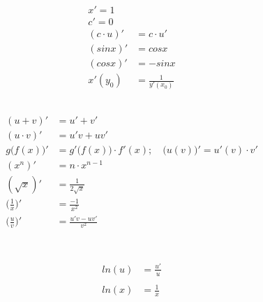 \documentclass[10pt,a4paper]{scrartcl}
\begin{document}
\newpage
	\begin{minipage}{0.3\linewidth}			
		\begin{align*}
		x' = 1 \\
		c' = 0 \\
		(c \cdot u)' &= c \cdot u'\\
		(sin x)' &= cos x\\
		(cos x)' &= -sin x \\
		x'(y_0) &= \frac{1}{y'(x_0)}\\
		\\
		\\
		\end{align*}
	\end{minipage}
	\begin{minipage}{0.4\linewidth}
		\begin{align*}
		(u + v)' &= u' + v' \\
		(u \cdot v)' &= u'v + uv' \\
		g\big(f(x)\big)' &= g'\big(f(x)\big) \cdot f'(x); \quad \big(u(v)\big)' = u'(v)\cdot v'\\
		(x^n)' &= n \cdot x^{n-1} \\
		(\sqrt{x})' &= \frac {1}{2 \sqrt{x}}	\\
		\bigg(\frac{1}{x}\bigg)' &= \frac{-1}{x^2} \\
		\bigg(\frac{u}{v}\bigg)' &= \frac{u'v  - uv'}{v^2} 
		\end{align*}
	\end{minipage}
	\begin{minipage}{0.3\linewidth}
		\begin{align*}
		\\
		\\
		\\
		\\
		\\
		ln (u) &= \frac{u'}{u}\\
		\\
		ln (x) &= \frac{1}{x}\\
		\end{align*}
	\end{minipage}
\end{document}
